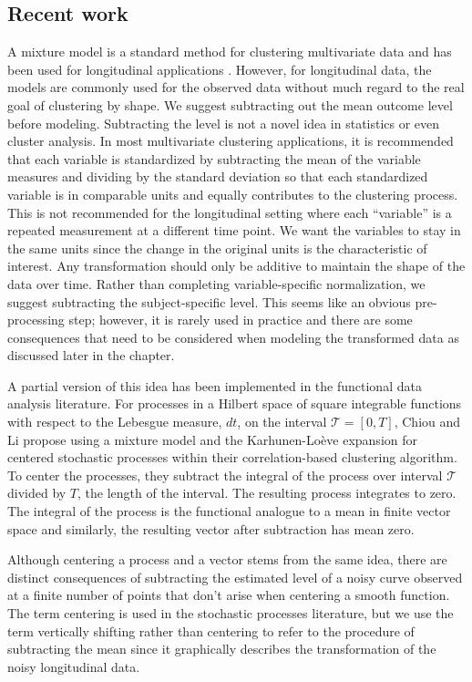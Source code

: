 \subsection{Recent work}
A mixture model is a standard method for clustering multivariate data \cite{everitt2009} and has been used for longitudinal applications \cite{muthen2010, jones2001}. However, for longitudinal data, the models are commonly used for the observed data without much regard to the real goal of clustering by shape. We suggest subtracting out the mean outcome level before modeling. Subtracting the level is not a novel idea in statistics or even cluster analysis. In most multivariate clustering applications, it is recommended that each variable is standardized by subtracting the mean of the variable measures and dividing by the standard deviation so that each standardized variable is in comparable units and equally contributes to the clustering process. This is not recommended for the longitudinal setting where each ``variable'' is a repeated measurement at a different time point. We want the variables to stay in the same units since the change in the original units is the characteristic of interest. Any transformation should only be additive to maintain the shape of the data over time. Rather than completing variable-specific normalization, we suggest subtracting the subject-specific level. This seems like an obvious pre-processing step; however, it is rarely used in practice and there are some consequences that need to be considered when modeling the transformed data as discussed later in the chapter. 

A partial version of this idea has been implemented in the functional data analysis literature. For processes in a Hilbert space of square integrable functions with respect to the Lebesgue measure, $dt$, on the interval $\mathcal{T}=[0,T]$, Chiou and Li \cite{chiou2008} propose using a mixture model and the Karhunen-Lo{\`e}ve expansion for centered stochastic processes within their correlation-based clustering algorithm. To center the processes, they subtract the integral of the process over interval $\mathcal{T}$ divided by $T$, the length of the interval. The resulting process integrates to zero. The integral of the process is the functional analogue to a mean in finite vector space and similarly, the resulting vector after subtraction has mean zero.

 Although centering a process and a vector stems from the same idea, there are distinct consequences of subtracting the estimated level of a noisy curve observed at a finite number of points that don't arise when centering a smooth function. The term centering is used in the stochastic processes literature, but we use the term vertically shifting rather than centering to refer to the procedure of subtracting the mean since it graphically describes the transformation of the noisy longitudinal data.
 
